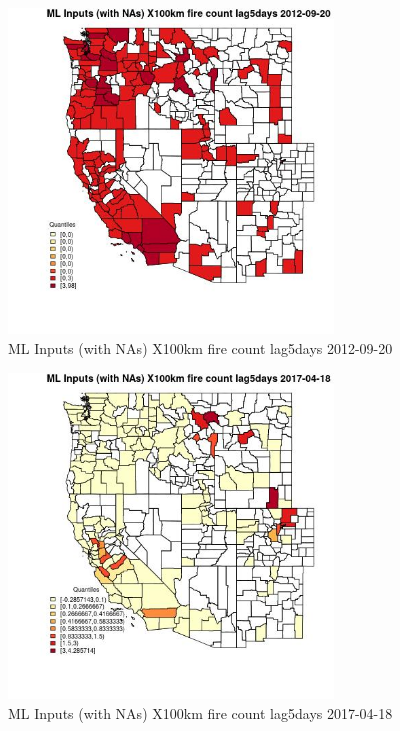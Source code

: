 \begin{figure} 
\centering  
\includegraphics[width=0.77\textwidth]{Code_Outputs/Report_ML_input_PM25_Step4_part_e_de_duplicated_aves_compiled_2019-05-14wNAs_CountyX100km_fire_count_lag5daysMean2012-09-20_2012-09-20.jpg} 
\caption{\label{fig:Report_ML_input_PM25_Step4_part_e_de_duplicated_aves_compiled_2019-05-14wNAsCountyX100km_fire_count_lag5daysMean2012-09-20_2012-09-20}ML Inputs (with NAs) X100km fire count lag5days 2012-09-20} 
\end{figure} 
 

\begin{figure} 
\centering  
\includegraphics[width=0.77\textwidth]{Code_Outputs/Report_ML_input_PM25_Step4_part_e_de_duplicated_aves_compiled_2019-05-14wNAs_CountyX100km_fire_count_lag5daysMean2017-04-18_2017-04-18.jpg} 
\caption{\label{fig:Report_ML_input_PM25_Step4_part_e_de_duplicated_aves_compiled_2019-05-14wNAsCountyX100km_fire_count_lag5daysMean2017-04-18_2017-04-18}ML Inputs (with NAs) X100km fire count lag5days 2017-04-18} 
\end{figure} 
 

